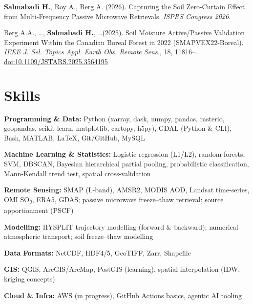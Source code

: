 \documentclass[10pt, a4paper]{article}
\newcommand{\publication}[1]{\noindent #1 \vspace{3pt}}
\begin{document}
\publication{\textbf{Salmabadi H.}, Roy A., Berg A. (2026).
Capturing the Soil Zero-Curtain Effect from Multi-Frequency Passive Microwave Retrievals.
\textit{ISPRS Congress 2026}.}

\publication{Berg A.A., \ldots, \textbf{Salmabadi H.}, \ldots (2025).
Soil Moisture Active/Passive Validation Experiment Within the Canadian Boreal Forest in 2022 (SMAPVEX22-Boreal).
\textit{IEEE J. Sel. Topics Appl. Earth Obs. Remote Sens.}, 18, 11816–.
\href{https://doi.org/10.1109/JSTARS.2025.3564195}{doi:10.1109/JSTARS.2025.3564195}}

\section{Skills}

\noindent\textbf{Programming \& Data:} Python (xarray, dask, numpy, pandas,
rasterio, geopandas, scikit-learn, matplotlib, cartopy, h5py), GDAL (Python
\& CLI), Bash, MATLAB, LaTeX, Git/GitHub, MySQL

\vspace{3pt}
\noindent\textbf{Machine Learning \& Statistics:} Logistic regression (L1/L2),
random forests, SVM, DBSCAN, Bayesian hierarchical partial pooling,
probabilistic classification, Mann-Kendall trend test, spatial cross-validation

\vspace{3pt}
\noindent\textbf{Remote Sensing:} SMAP (L-band), AMSR2, MODIS AOD,
Landsat time-series, OMI SO\textsubscript{2}, ERA5, GDAS;
passive microwave freeze–thaw retrieval; source apportionment (PSCF)

\vspace{3pt}
\noindent\textbf{Modelling:} HYSPLIT trajectory modelling (forward \&
backward); numerical atmospheric transport; soil freeze–thaw modelling

\vspace{3pt}
\noindent\textbf{Data Formats:} NetCDF, HDF4/5, GeoTIFF, Zarr, Shapefile

\vspace{3pt}
\noindent\textbf{GIS:} QGIS, ArcGIS/ArcMap, PostGIS (learning), spatial
interpolation (IDW, kriging concepts)

\vspace{3pt}
\noindent\textbf{Cloud \& Infra:} AWS (in progress), GitHub Actions basics,
agentic AI tooling

\end{document}
